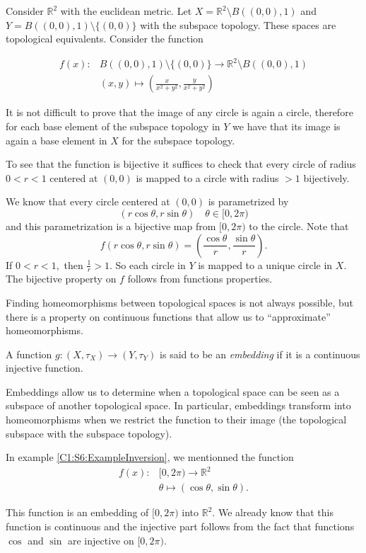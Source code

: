 \documentclass[
	fontsize=10pt, %
	twoside=false, %
	secnumdepth=1, %
]{kaobook}
\begin{document}
\begin{example}
\label{C1:S6:ExampleInversion}
Consider $\mathbb{R}^2$ with the euclidean metric. Let $X=\mathbb{R}^2\setminus B((0,0),1)$ and $Y=B((0,0),1)\setminus\{(0,0)\}$ with the subspace topology. These spaces are topological equivalents. Consider the function 

\begin{eqnarray*}
f(x):&B((0,0),1)\setminus\{(0,0)\}\to \mathbb{R}^2\setminus B((0,0),1)\\
 &(x,y)\mapsto \left(\frac{x}{x^2+y^2},\frac{y}{x^2+y^2}\right)
\end{eqnarray*}

It is not difficult to prove that the image of any circle is again a circle, therefore for each base element of the subspace topology in $Y$ we have that its image is again a base element in $X$ for the subspace topology.

To see that the function is bijective it suffices to check that every circle of radius $0<r<1$ centered at $(0,0)$ is mapped to a circle with radius $>1$ bijectively. 

We know that every circle centered at $(0,0)$ is parametrized by $$(r\cos\theta,r\sin\theta)\quad \theta\in[0,2\pi)$$ and this parametrization is a bijective map from $[0,2\pi)$ to the circle. Note that $$f\left(r\cos\theta,r\sin\theta\right)=\left(\frac{\cos\theta}{r},\frac{\sin\theta}{r}\right).$$ If $0<r<1,$ then $\frac{1}{r}>1.$ So each circle in $Y$ is mapped to a unique circle in $X.$ The bijective property on $f$ follows from functions properties.
\end{example}

Finding homeomorphisms between topological spaces is not always possible, but there is a property on continuous functions that allow us to ``approximate'' homeomorphisms.

\begin{definition}[Embedding]
A function $g:(X,\tau_X)\to (Y,\tau_Y)$ is said to be an \emph{embedding} if it is a continuous injective function.
\end{definition}

Embeddings allow us to determine when a topological space can be seen as a subspace of another topological space. In particular, embeddings transform into homeomorphisms when we restrict the function to their image (the topological subspace with the subspace topology).

\begin{example}
\label{C1:S6:Example:Circleembedding}
In example \ref{C1:S6:ExampleInversion}, we mentionned the function 
\begin{eqnarray*}
f(x):&[0,2\pi)\to \mathbb{R}^2\\
 &\theta \mapsto \left(\cos\theta,\sin\theta\right).
\end{eqnarray*}

This function is an embedding of $[0,2\pi)$ into $\mathbb{R}^2.$ We already know that this function is continuous and the injective part follows from the fact that functions $\cos$ and $\sin$ are injective on $[0,2\pi).$
\end{example}
\end{document}
